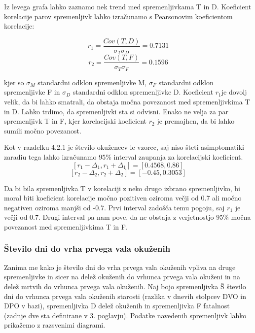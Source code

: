 \documentclass[a4paper,11pt]{article}
\begin{document}
Iz levega grafa lahko zaznamo nek trend med spremenljivkama T in D. Koeficient korelacije parov spremenljivk lahko izračunamo s Pearsonovim koeficientom korelacije:

\[r_1 = \frac{Cov(T,D)}{\sigma_{T} \sigma_{D}} = 0.7131\]
\[r_2 = \frac{Cov(T,F)}{\sigma_{T} \sigma_{F}} = 0.1596\]

kjer so \(\sigma_{M}\) standardni odklon spremenljivke M, \(\sigma_{F}\) standardni odklon spremenljivke F in \(\sigma_{D}\) standardni odklon spremenljivke D. Koeficient \(r_1\)je dovolj velik, da bi lahko smatrali, da obstaja močna povezanost med spremenljivkima T in D. Lahko trdimo, da spremenljivki sta si odvisni. Enako ne velja za par spremenljivk T in F, kjer korelacijski koeficient \(r_2\) je premajhen, da bi lahko sumili močno povezanost.

Kot v razdelku 4.2.1 je število okuženecv le vzorec, saj niso šteti asimptomatiki zaradiu tega lahko izračunamo 95\% interval zaupanja za korelacijski koeficient. 
\[[r_1 - \Delta_1, r_1 + \Delta_1] = [0.4568, 0.86]\]
\[[r_2 - \Delta_2, r_2 + \Delta_2] = [-0.45, 0.3053]\]

Da bi bila spremenljivka T v korelaciji z neko drugo izbrano spremenljivko, bi moral biti koeficient korelacije močno pozitiven oziroma večji od 0.7 ali močno negativen oziroma manjši od -0.7. Prvi interval zadošča temu pogoju, saj \(r_1\) je večji od 0.7. Drugi interval pa nam pove, da ne obstaja z verjetnostjo 95\% močna povezanost med spremenljivkima T in F.

\subsubsection{Število dni do vrha prvega vala okuženih}

Zanima me kako je število dni do vrha prvega vala okuženih vpliva na druge spremenljivke in sicer na delež okuženih do vrhunca prvega vala okuženi in na delež mrtvih do vrhunca prvega vala okuženih. Naj bojo spremenljivka Š število dni do vrhunca prvega vala okuženih starosti (razlika v dnevih stolpcev DVO in DPO v bazi), spremenljivka D delež okuženih in spremenljivka F fatalnost (zadnje dve sta definirane v 3. poglavju). Podatke navedenih spremenljivk lahko prikažemo z razsvenimi diagrami.
\end{document}
